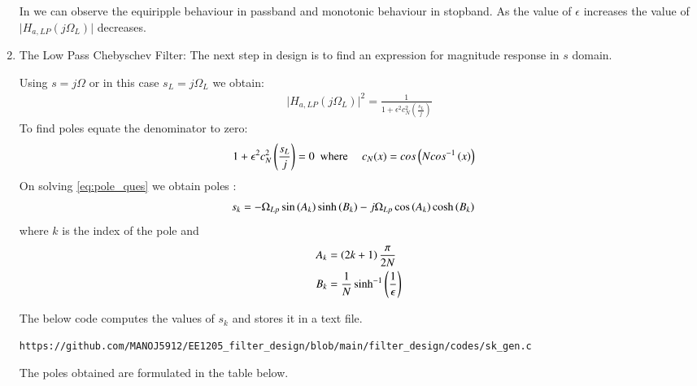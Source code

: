 \documentclass{article}
\begin{document}
\begin{enumerate}
In  we can observe the equiripple behaviour in passband and monotonic behaviour in stopband. As the value of $\epsilon$ increases the value of $\vert H_{a,LP}(j\Omega_L)\vert$ decreases.\\
          
\item {The Low Pass Chebyschev Filter:} The next step in design is to find an expression for magnitude response in $s$ domain.
          
Using $s=j\Omega$ or in this case $s_{L}=j\Omega_{L}$ we obtain:
\begin{align}
\vert H_{a,LP}(j\Omega_L)\vert^2 = \frac{1}{1 + \epsilon^2c_N^2(\frac{s_L}{j})}
          \end{align}
          To find poles equate the denominator to zero:
          \begin{align}
              {1 + \epsilon^2c_N^2\ensuremath{\left(\frac{s_L}{j}\right)}} & =0\hspace{5pt }
              \text{where } \hspace{10pt} c_N(x) = cos\left(Ncos^{-1}\left(x\right)\right) \label{eq:pole_ques}
          \end{align}
          On solving \eqref{eq:pole_ques} we obtain poles :
          \begin{align}
              s_{k} & = -\Omega_{Lp} \sin\left(A_k\right)\sinh\left(B_k\right) - j\Omega_{Lp}\cos\left(A_k\right)\cosh\left(B_k\right)
          \end{align}
          where $k$ is the index of the pole and \\
          \begin{align}
              A_k & = \left(2k+1\right)\frac{\pi}{2N}                       \\
              B_k & = \frac{1}{N} \sinh^{-1}\left(\frac{1}{\epsilon}\right)
          \end{align}
          
          The below code computes the values of $s_k$ and stores it in a text file. 
          \begin{lstlisting}
https://github.com/MANOJ5912/EE1205_filter_design/blob/main/filter_design/codes/sk_gen.c
\end{lstlisting}
 The poles obtained are formulated in the table below.
 
          

\end{enumerate}
\end{document}
